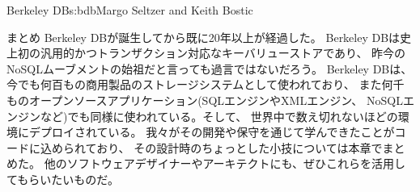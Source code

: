 \begin{aosachapter}{Berkeley DB}{s:bdb}{Margo Seltzer and Keith Bostic}
\begin{aosasect1}{まとめ}
Berkeley DBが誕生してから既に20年以上が経過した。
Berkeley DBは史上初の汎用的かつトランザクション対応なキーバリューストアであり、
昨今のNoSQLムーブメントの始祖だと言っても過言ではないだろう。
Berkeley DBは、今でも何百もの商用製品のストレージシステムとして使われており、
また何千ものオープンソースアプリケーション(SQLエンジンやXMLエンジン、
NoSQLエンジンなど)でも同様に使われている。そして、
世界中で数え切れないほどの環境にデプロイされている。
我々がその開発や保守を通じて学んできたことがコードに込められており、
その設計時のちょっとした小技については本章でまとめた。
他のソフトウェアデザイナーやアーキテクトにも、ぜひこれらを活用してもらいたいものだ。

\end{aosasect1}

\end{aosachapter}
